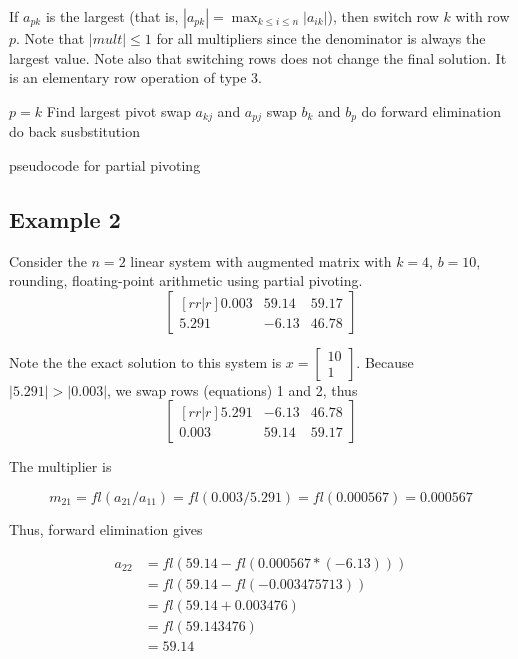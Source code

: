 \documentclass [titlepage,12pt,letter] {article}
\begin{document}
If $a_{pk}$ is the largest (that is, $|a_{pk}|=\max_{k \leq i \leq n}|a_{ik}|$), then switch row $k$ with row $p$. Note that $|mult| \leq 1$ for all multipliers since the denominator is always the largest value. Note also that switching rows does not change the final solution. It is an elementary row operation of type 3.

\begin{algorithm}[H]
\begin{algorithmic}[1]
\STATE $p = k$
\STATE Find largest pivot
\ENDFOR
{}
\STATE swap $a_{kj}$ and $a_{pj}$
\ENDFOR
\STATE swap $b_{k}$ and $b_{p}$
\ENDIF
\STATE do forward elimination
\ENDFOR
\STATE do back susbstitution
\end{algorithmic}
\caption{pseudocode for partial pivoting}
\label{alg:seq}
\end{algorithm}


\subsection{Example 2} Consider the $n=2$ linear system with augmented matrix with $k=4$, $b=10$, rounding, floating-point arithmetic using partial pivoting.
\[
\begin{bmatrix}[rr|r]
	0.003	&	59.14	&	59.17 \\
	5.291		&	-6.13	&	46.78
\end{bmatrix}
\]

Note the the exact solution to this system is $x=\begin{bmatrix}10 \\ 1 \end{bmatrix}$. Because $|5.291| > |0.003|$, we swap rows (equations) 1 and 2, thus
\[
\begin{bmatrix}[rr|r]
	5.291		&	-6.13	&	46.78 \\
	0.003	&	59.14	&	59.17
\end{bmatrix}
\]

The multiplier is

\[
m_{21}=fl(a_{21}/a_{11})=fl(0.003/5.291)=fl(0.000567)=0.000567
\]

Thus, forward elimination gives

\begin{align*}
a_{22}&=fl(59.14-fl(0.000567*(-6.13))) \\
&=fl(59.14-fl(-0.003475713)) \\
&=fl(59.14+0.003476) \\
&=fl(59.143476) \\
&=59.14
\end{align*}
\end{document}
